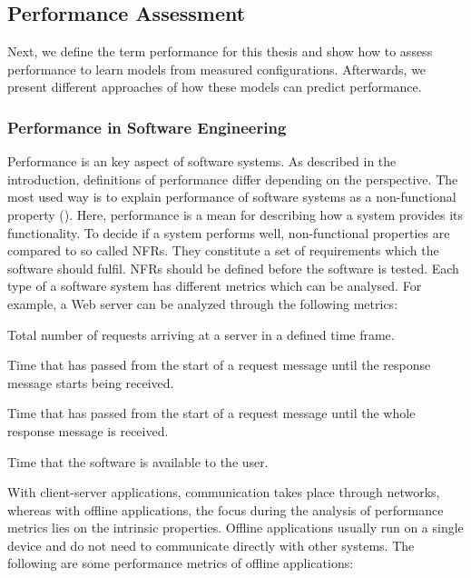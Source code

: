 \subsection{Performance Assessment}
\label{background_perf}

Next, we define the term performance for this thesis and show how to assess performance to learn models from measured configurations. 
Afterwards, we present different approaches of how these models can predict performance.

\subsubsection{Performance in Software Engineering}
\label{perf_general}

Performance is an key aspect of software systems. 
As described in the introduction, definitions of performance differ depending on the perspective. 
The most used way is to explain performance of software systems as a non-functional property (\cite{Molyneaux:2009:AAP:1550832,liggesmeyer2002software}). 
Here, performance is a mean for describing how a system provides its functionality. 
To decide if a system performs well, non-functional properties are compared to so called \acp{NFR}. 
They constitute a set of requirements which the software should fulfil. 
\acp{NFR} should be defined before the software is tested. 
Each type of a software system has different metrics which can be analysed. 
For example, a Web server can be analyzed through the following metrics:

\begin{description}[style=multiline,leftmargin=10em]
	\item [Hit Rate] Total number of requests arriving at a server in a defined time frame.
	\item [Latency] Time that has passed from the start of a request message until the response message starts being received.
	\item [Response Time] Time that has passed from the start of a request message until the whole response message is received.
	\item [Availability] Time that the software is available to the user.
\end{description}

With client-server applications, communication takes place through networks, whereas with offline applications, the focus during the analysis of performance metrics lies on the intrinsic properties.
Offline applications usually run on a single device and do not need to communicate directly with other systems. 
The following are some performance metrics of offline applications:

